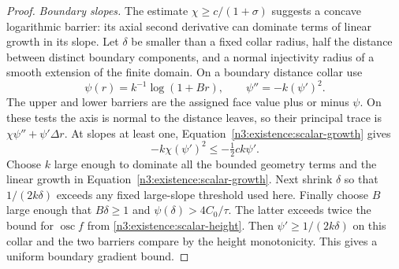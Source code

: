 \begin{proof}
\emph{Boundary slopes.}
The estimate $\chi\ge c/(1+\sigma)$ suggests a concave logarithmic
barrier: its axial second derivative can dominate terms of linear
growth in its slope.
Let $\delta$ be smaller than a fixed collar radius, half the distance
between distinct boundary components, and a normal injectivity
radius of a smooth extension of the finite domain.  On a boundary
distance collar use
\begin{equation}\label{n3:existence:logarithmic-modulus}
 \psi(r)=k^{-1}\log(1+Br),\qquad
 \psi''=-k(\psi')^2.
\end{equation}
The upper and lower barriers are the assigned face value plus or
minus $\psi$.  On these tests the axis is normal to the distance
leaves, so their principal trace is
$\chi\psi''+\psi'\Delta r$.  At slopes at least one,
Equation~\eqref{n3:existence:scalar-growth} gives
\begin{equation}\label{n3:existence:logarithmic-dominance}
 -k\chi(\psi')^2\le-\tfrac12ck\psi'.
\end{equation}
Choose $k$ large enough to dominate all the bounded geometry terms
and the linear growth in Equation~\eqref{n3:existence:scalar-growth}.
Next shrink $\delta$ so that $1/(2k\delta)$ exceeds any fixed
large-slope threshold used here.  Finally choose $B$ large enough
that $B\delta\ge1$ and $\psi(\delta)>4C_0/\tau$.
The latter exceeds twice the bound for $\operatorname{osc}f$
from \eqref{n3:existence:scalar-height}.  Then $\psi'\ge1/(2k\delta)$ on this collar and
the two barriers compare by the height monotonicity.  This gives
a uniform boundary gradient bound.


\end{proof}
